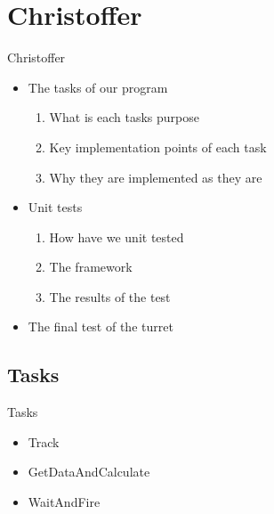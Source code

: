 \section{Christoffer}
\begin{frame}{Christoffer}
\begin{itemize}
\end{itemize}
\end{frame}

\begin{frame}{}
\begin{itemize}
  \item The tasks of our program
  		\begin{enumerate}
  			\item What is each tasks purpose
  			\item Key implementation points of each task
  			\item Why they are implemented as they are  
		\end{enumerate}
  \item Unit tests
  		\begin{enumerate}
  			\item How have we unit tested
  			\item The framework
  			\item The results of the test
		\end{enumerate}
  \item The final test of the turret
\end{itemize}
\end{frame}

\subsection{Tasks}
\begin{frame}{Tasks}
\begin{itemize}
  \item Track
  \item GetDataAndCalculate
  \item WaitAndFire
\end{itemize}
\end{frame}

